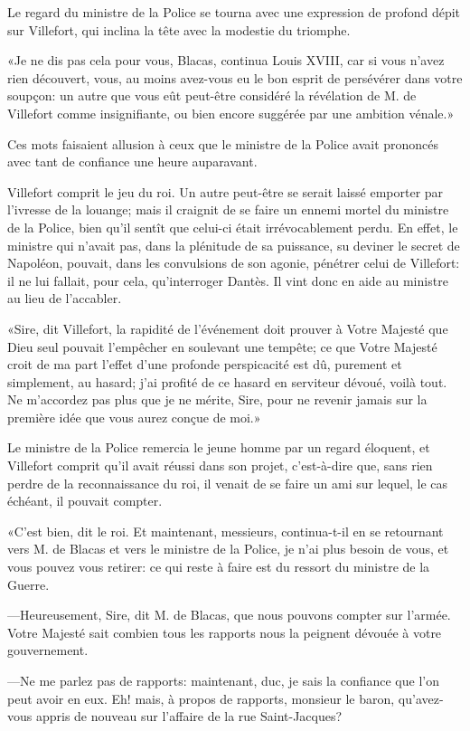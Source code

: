 Le regard du ministre de la Police se tourna avec une expression de profond dépit sur Villefort, qui inclina la tête avec la modestie du triomphe.

«Je ne dis pas cela pour vous, Blacas, continua Louis XVIII, car si vous n'avez rien découvert, vous, au moins avez-vous eu le bon esprit de persévérer dans votre soupçon: un autre que vous eût peut-être considéré la révélation de M. de Villefort comme insignifiante, ou bien encore suggérée par une ambition vénale.»

Ces mots faisaient allusion à ceux que le ministre de la Police avait prononcés avec tant de confiance une heure auparavant.

Villefort comprit le jeu du roi. Un autre peut-être se serait laissé emporter par l'ivresse de la louange; mais il craignit de se faire un ennemi mortel du ministre de la Police, bien qu'il sentît que celui-ci était irrévocablement perdu. En effet, le ministre qui n'avait pas, dans la plénitude de sa puissance, su deviner le secret de Napoléon, pouvait, dans les convulsions de son agonie, pénétrer celui de Villefort: il ne lui fallait, pour cela, qu'interroger Dantès. Il vint donc en aide au ministre au lieu de l'accabler.

«Sire, dit Villefort, la rapidité de l'événement doit prouver à Votre Majesté que Dieu seul pouvait l'empêcher en soulevant une tempête; ce que Votre Majesté croit de ma part l'effet d'une profonde perspicacité est dû, purement et simplement, au hasard; j'ai profité de ce hasard en serviteur dévoué, voilà tout. Ne m'accordez pas plus que je ne mérite, Sire, pour ne revenir jamais sur la première idée que vous aurez conçue de moi.»

Le ministre de la Police remercia le jeune homme par un regard éloquent, et Villefort comprit qu'il avait réussi dans son projet, c'est-à-dire que, sans rien perdre de la reconnaissance du roi, il venait de se faire un ami sur lequel, le cas échéant, il pouvait compter.

«C'est bien, dit le roi. Et maintenant, messieurs, continua-t-il en se retournant vers M. de Blacas et vers le ministre de la Police, je n'ai plus besoin de vous, et vous pouvez vous retirer: ce qui reste à faire est du ressort du ministre de la Guerre.

—Heureusement, Sire, dit M. de Blacas, que nous pouvons compter sur l'armée. Votre Majesté sait combien tous les rapports nous la peignent dévouée à votre gouvernement.

—Ne me parlez pas de rapports: maintenant, duc, je sais la confiance que l'on peut avoir en eux. Eh! mais, à propos de rapports, monsieur le baron, qu'avez-vous appris de nouveau sur l'affaire de la rue Saint-Jacques?

